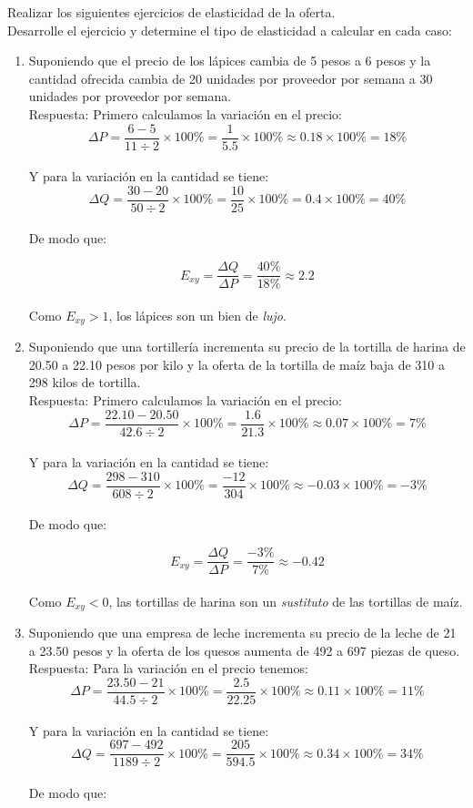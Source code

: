 \documentclass[a4paper,12pt]{article}
\begin{document}
Realizar los siguientes ejercicios de elasticidad de la oferta. \\
\vspace{0.5cm}
Desarrolle el ejercicio y determine el tipo de elasticidad a calcular en cada caso:\\
\begin{enumerate}
	\item Suponiendo que el precio de los lápices cambia de 5 pesos a 6 pesos y la cantidad
ofrecida cambia de 20 unidades por proveedor por semana a 30 unidades por proveedor
por semana.\\
	Respuesta: Primero calculamos la variación en el precio:
	\[\Delta P = \frac{6 - 5}{11 \div 2} \times 100\% = \frac{1}{5.5} \times 100\% \approx 0.18 \times 100\% = 18\% \]
	\\ Y para la variación en la cantidad se tiene:
	\[\Delta Q = \frac{30 - 20}{50 \div 2} \times 100\% = \frac{10}{25} \times 100\% = 0.4 \times 100\% = 40\% \]\\
	De modo que:

	\[E_{xy} = \frac{\Delta Q}{\Delta P} = \frac{40\%}{18\%} \approx 2.2 \] \\

	Como $E_{xy} > 1$, los lápices son un bien de \emph{lujo}.

	\item Suponiendo que una tortillería incrementa su precio de la tortilla de harina de 20.50
a 22.10 pesos por kilo y la oferta de la tortilla de maíz baja de 310 a 298 kilos de tortilla. \\
	Respuesta: Primero calculamos la variación en el precio:
	\[\Delta P = \frac{22.10 - 20.50}{ 42.6 \div 2} \times 100\% = \frac{1.6}{21.3} \times 100\% \approx 0.07 \times 100\% = 7\% \]
	\\ Y para la variación en la cantidad se tiene:
	\[\Delta Q = \frac{298 - 310}{608 \div 2} \times 100\% = \frac{-12}{304} \times 100\% \approx -0.03 \times 100\% = -3\% \]\\
	De modo que:

	\[E_{xy} = \frac{\Delta Q}{\Delta P} = \frac{-3\%}{7\%} \approx -0.42 \] \\

	Como $E_{xy} < 0 $, las tortillas de harina son un \emph{sustituto} de las tortillas de maíz.

	\item Suponiendo que una empresa de leche incrementa su precio de la leche de 21 a
23.50 pesos y la oferta de los quesos aumenta de 492 a 697 piezas de queso.\\
	Respuesta: Para la variación en el precio tenemos:
	\[\Delta P = \frac{23.50 - 21}{44.5 \div 2} \times 100\% = \frac{2.5}{22.25} \times 100\% \approx 0.11 \times 100\% = 11\% \]
	\\ Y para la variación en la cantidad se tiene:
	\[\Delta Q = \frac{697 - 492}{1189 \div 2} \times 100\% = \frac{205}{594.5} \times 100\% \approx 0.34 \times 100\% = 34\% \]\\
	De modo que:


\end{enumerate}
\end{document}
